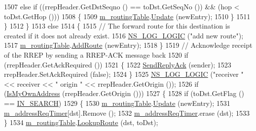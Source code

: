 \begin{DoxyCode}
1507           \textcolor{keywordflow}{else} \textcolor{keywordflow}{if} ((rrepHeader.GetDstSeqno () == toDst.GetSeqNo ()) && (hop < toDst.GetHop ()))
1508             \{
1509               \hyperlink{classns3_1_1aodv_1_1RoutingProtocol_a4e1003a34c8adc96db71096d88c98ae0}{m\_routingTable}.\hyperlink{classns3_1_1aodv_1_1RoutingTable_a39fb5335110164f4c1b97682a3812dc1}{Update} (newEntry);
1510             \}
1511         \}
1512     \}
1513   \textcolor{keywordflow}{else}
1514     \{
1515       \textcolor{comment}{// The forward route for this destination is created if it does not already exist.}
1516       \hyperlink{group__logging_ga88acd260151caf2db9c0fc84997f45ce}{NS\_LOG\_LOGIC} (\textcolor{stringliteral}{"add new route"});
1517       \hyperlink{classns3_1_1aodv_1_1RoutingProtocol_a4e1003a34c8adc96db71096d88c98ae0}{m\_routingTable}.\hyperlink{classns3_1_1aodv_1_1RoutingTable_a579e562e38e67d510de1ff2c87806c76}{AddRoute} (newEntry);
1518     \}
1519   \textcolor{comment}{// Acknowledge receipt of the RREP by sending a RREP-ACK message back}
1520   \textcolor{keywordflow}{if} (rrepHeader.GetAckRequired ())
1521     \{
1522       \hyperlink{classns3_1_1aodv_1_1RoutingProtocol_aec193d679517de0a34d2e9d592b7bc77}{SendReplyAck} (sender);
1523       rrepHeader.SetAckRequired (\textcolor{keyword}{false});
1524     \}
1525   \hyperlink{group__logging_ga88acd260151caf2db9c0fc84997f45ce}{NS\_LOG\_LOGIC} (\textcolor{stringliteral}{"receiver "} << receiver << \textcolor{stringliteral}{" origin "} << rrepHeader.GetOrigin ());
1526   \textcolor{keywordflow}{if} (\hyperlink{classns3_1_1aodv_1_1RoutingProtocol_a822621de276958cf1d22fb3be536bb49}{IsMyOwnAddress} (rrepHeader.GetOrigin ()))
1527     \{
1528       \textcolor{keywordflow}{if} (toDst.GetFlag () == \hyperlink{group__aodv_gga44216921a9c725a5ab8bc19059052a26aba44cda5a5df371b6567f70d7d8311fa}{IN\_SEARCH})
1529         \{
1530           \hyperlink{classns3_1_1aodv_1_1RoutingProtocol_a4e1003a34c8adc96db71096d88c98ae0}{m\_routingTable}.\hyperlink{classns3_1_1aodv_1_1RoutingTable_a39fb5335110164f4c1b97682a3812dc1}{Update} (newEntry);
1531           \hyperlink{classns3_1_1aodv_1_1RoutingProtocol_a3e21cac8acb05e13339eb0cabf13ddcf}{m\_addressReqTimer}[dst].Remove ();
1532           \hyperlink{classns3_1_1aodv_1_1RoutingProtocol_a3e21cac8acb05e13339eb0cabf13ddcf}{m\_addressReqTimer}.erase (dst);
1533         \}
1534       \hyperlink{classns3_1_1aodv_1_1RoutingProtocol_a4e1003a34c8adc96db71096d88c98ae0}{m\_routingTable}.\hyperlink{classns3_1_1aodv_1_1RoutingTable_a90cbc8a2c65cd68ccdaf768fcbb5d723}{LookupRoute} (dst, toDst);

\end{DoxyCode}
